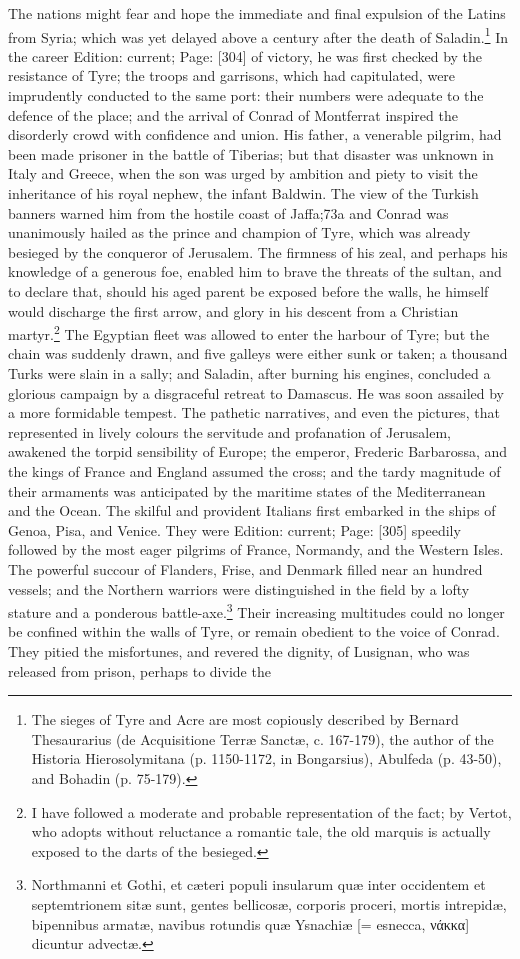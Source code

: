 The nations might fear and hope the immediate and final expulsion of the Latins from Syria; which was yet delayed above a century after the death of Saladin.\footnote{The sieges of Tyre and Acre are most copiously described by Bernard Thesaurarius (de Acquisitione Terræ Sanctæ, c. 167-179), the author of the Historia Hierosolymitana (p. 1150-1172, in Bongarsius), Abulfeda (p. 43-50), and Bohadin (p. 75-179).} In the career Edition: current; Page: [304] of victory, he was first checked by the resistance of Tyre; the troops and garrisons, which had capitulated, were imprudently conducted to the same port: their numbers were adequate to the defence of the place; and the arrival of Conrad of Montferrat inspired the disorderly crowd with confidence and union. His father, a venerable pilgrim, had been made prisoner in the battle of Tiberias; but that disaster was unknown in Italy and Greece, when the son was urged by ambition and piety to visit the inheritance of his royal nephew, the infant Baldwin. The view of the Turkish banners warned him from the hostile coast of Jaffa;73a and Conrad was unanimously hailed as the prince and champion of Tyre, which was already besieged by the conqueror of Jerusalem. The firmness of his zeal, and perhaps his knowledge of a generous foe, enabled him to brave the threats of the sultan, and to declare that, should his aged parent be exposed before the walls, he himself would discharge the first arrow, and glory in his descent from a Christian martyr.\footnote{I have followed a moderate and probable representation of the fact; by Vertot, who adopts without reluctance a romantic tale, the old marquis is actually exposed to the darts of the besieged.} The Egyptian fleet was allowed to enter the harbour of Tyre; but the chain was suddenly drawn, and five galleys were either sunk or taken; a thousand Turks were slain in a sally; and Saladin, after burning his engines, concluded a glorious campaign by a disgraceful retreat to Damascus. He was soon assailed by a more formidable tempest. The pathetic narratives, and even the pictures, that represented in lively colours the servitude and profanation of Jerusalem, awakened the torpid sensibility of Europe; the emperor, Frederic Barbarossa, and the kings of France and England assumed the cross; and the tardy magnitude of their armaments was anticipated by the maritime states of the Mediterranean and the Ocean. The skilful and provident Italians first embarked in the ships of Genoa, Pisa, and Venice. They were Edition: current; Page: [305] speedily followed by the most eager pilgrims of France, Normandy, and the Western Isles. The powerful succour of Flanders, Frise, and Denmark filled near an hundred vessels; and the Northern warriors were distinguished in the field by a lofty stature and a ponderous battle-axe.\footnote{Northmanni et Gothi, et cæteri populi insularum quæ inter occidentem et septemtrionem sitæ sunt, gentes bellicosæ, corporis proceri, mortis intrepidæ, bipennibus armatæ, navibus rotundis quæ Ysnachiæ [= esnecca, \textgreek{νάκκα}] dicuntur advectæ.} Their increasing multitudes could no longer be confined within the walls of Tyre, or remain obedient to the voice of Conrad. They pitied the misfortunes, and revered the dignity, of Lusignan, who was released from prison, perhaps to divide the 